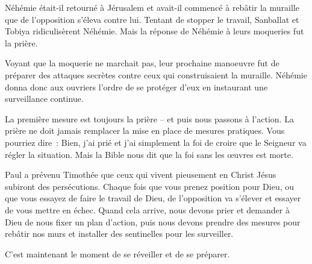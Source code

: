 


 Néhémie était-il retourné à Jérusalem
 et avait-il commencé à rebâtir la muraille que de l'opposition
 s'éleva contre lui.
 Tentant de stopper le travail, Sanballat et Tobiya ridiculisèrent Néhémie.
 Mais la réponse de Néhémie à leurs moqueries fut la prière.

Voyant que la moquerie ne marchait pas, leur prochaine manoeuvre
 fut de préparer des attaques secrètes contre ceux qui construisaient
 la muraille.
 Néhémie donna donc aux ouvriers l'ordre de se protéger d'eux en instaurant
 une surveillance continue.

La première mesure est toujours la prière -- et puis nous passons à l'action.
 La prière ne doit jamais remplacer la mise en place de mesures pratiques.
 Vous pourriez dire~:
 \og Bien, j'ai prié et j'ai simplement la foi de croire que le Seigneur
 va régler la situation. \fg{}
 Mais la Bible nous dit que la foi sans les œuvres est morte.


Paul a prévenu Timothée que ceux qui vivent pieusement en Christ Jésus
 subiront des persécutions.
 Chaque fois que vous prenez position pour Dieu,
 ou que vous essayez de faire le travail de Dieu,
 de l'opposition va s'élever et essayer de vous mettre en échec.
 Quand cela arrive, nous devons prier et demander à Dieu de nous fixer
 un plan d'action, puis nous devons prendre des mesures pour rebâtir
 nos murs et installer des sentinelles pour les surveiller.

C'est maintenant le moment de se réveiller et de se préparer. 


\dvrule






